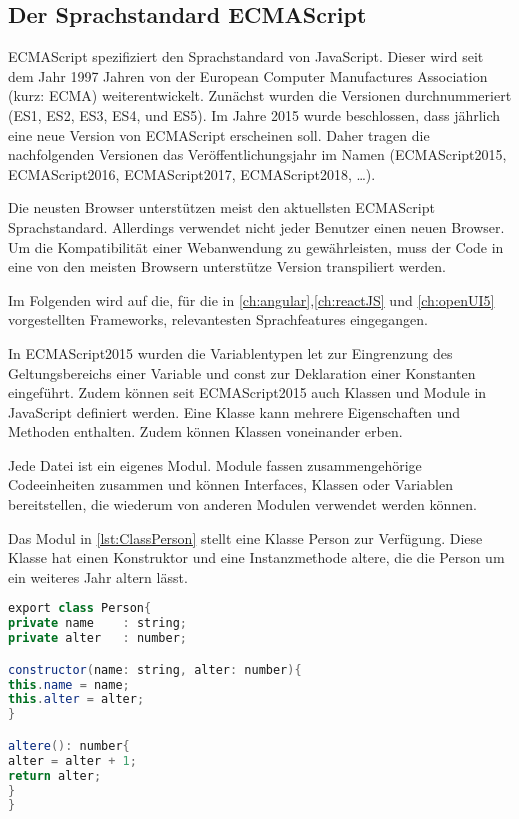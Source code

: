 \subsection{Der Sprachstandard ECMAScript}\label{sec:der-sprachstandard-ecmascript}
ECMAScript spezifiziert den Sprachstandard von JavaScript. Dieser wird seit dem Jahr 1997 Jahren von der European Computer Manufactures Association (kurz: ECMA) weiterentwickelt. Zunächst wurden die Versionen durchnummeriert (ES1, ES2, ES3, ES4, und ES5). Im Jahre 2015 wurde beschlossen, dass jährlich eine neue Version von ECMAScript erscheinen soll. Daher tragen die nachfolgenden Versionen das Veröffentlichungsjahr im Namen (ECMAScript2015, ECMAScript2016, ECMAScript2017, ECMAScript2018, …). 

Die neusten Browser unterstützen meist den aktuellsten ECMAScript Sprachstandard. Allerdings verwendet nicht jeder Benutzer einen neuen Browser. Um die Kompatibilität einer Webanwendung zu gewährleisten, muss der Code in eine von den meisten Browsern unterstütze Version transpiliert werden.\autocites[vgl.][27\psqq]{Woiwode.2018}[vgl.][]{Terlson.2018}[vgl.][13\psqq]{Steyer.2017}

Im Folgenden wird auf die, für die in \autoref{ch:angular},\ref{ch:reactJS} und \ref{ch:openUI5} vorgestellten Frameworks, relevantesten Sprachfeatures eingegangen.  

In ECMAScript2015 wurden die Variablentypen let zur Eingrenzung des Geltungsbereichs einer Variable und const zur Deklaration einer Konstanten eingeführt. Zudem können seit ECMAScript2015 auch Klassen und Module in JavaScript definiert werden. Eine Klasse kann mehrere Eigenschaften und Methoden enthalten. Zudem können Klassen voneinander erben.

Jede Datei ist ein eigenes Modul. Module fassen zusammengehörige Codeeinheiten zusammen und können Interfaces, Klassen oder Variablen bereitstellen, die wiederum von anderen Modulen verwendet werden können.\autocites[vgl.][34\psq]{Woiwode.2018}[vgl.][19\psqq]{Steyer.2017}

Das Modul in \autoref{lst:ClassPerson} stellt eine Klasse Person zur Verfügung. Diese Klasse hat einen Konstruktor und eine Instanzmethode altere, die die Person um ein weiteres Jahr altern lässt.

\begin{lstlisting}[caption=Eine Klasse Person wird von einem Modul bereitgestellt , label=lst:ClassPerson, language=Java]
export class Person{
private name 	: string;
private alter 	: number;

constructor(name: string, alter: number){
this.name = name;
this.alter = alter;
}

altere(): number{
alter = alter + 1;
return alter;
}
}
\end{lstlisting}

